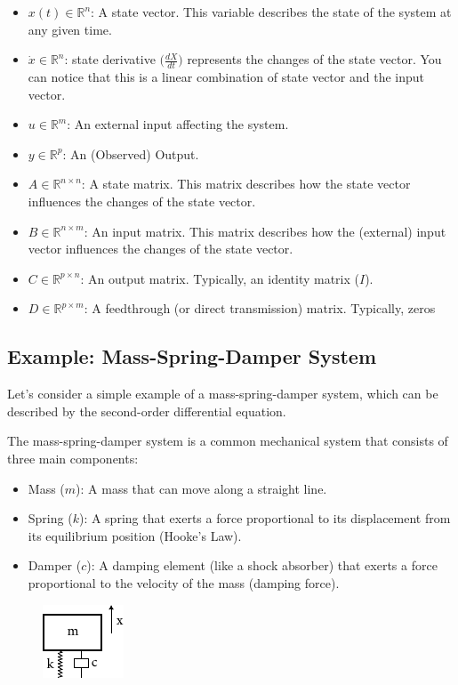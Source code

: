 \begin{itemize}
	\item $x(t)\in \mathbb{R}^n$: A state vector. This variable describes the state of the system at any given time.
	\item $\dot{x}\in \mathbb{R}^n$: state derivative \ie $\big(\frac{dX}{dt}\big)$ represents the changes of the state vector. You can notice that this is a linear combination of state vector and the input vector. 
	\item $u\in \mathbb{R}^m$: An external input affecting the system.
	\item $y\in \mathbb{R}^p$: An (Observed) Output.
	\item $A\in \mathbb{R}^{n\times n}$: A state matrix. This matrix describes how the state vector influences the changes of the state vector. 
	\item $B\in \mathbb{R}^{n\times m}$: An input matrix. This matrix describes how the (external) input vector influences the changes of the state vector. 
	\item $C\in \mathbb{R}^{p\times n}$: An output matrix. Typically, an identity matrix ($I$).
	\item $D\in \mathbb{R}^{p\times m}$: A feedthrough (or direct transmission) matrix. Typically, zeros
\end{itemize}

\subsection{Example: Mass-Spring-Damper System} 

Let's consider a simple example of a mass-spring-damper system, which can be described by the second-order differential equation.

The mass-spring-damper system is a common mechanical system that consists of three main components:
\begin{itemize}
	\item  Mass (\(m\)): A mass that can move along a straight line.
	\item  Spring (\(k\)): A spring that exerts a force proportional to its displacement from its equilibrium position (Hooke's Law).
	\item  Damper (\(c\)): A damping element (like a shock absorber) that exerts a force proportional to the velocity of the mass (damping force).
\end{itemize}

\begin{figure}[h]
	\centering
	\includegraphics[scale=2.0]{./images/state_space/mass_spring.pdf}
\end{figure}

